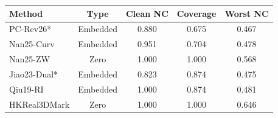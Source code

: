 \begin{tabular}{lcccc}\toprule
Method & Type & Clean NC & Coverage & Worst NC \\\midrule
PC-Rev26* & Embedded & 0.880 & 0.675 & 0.467 \\
Nan25-Curv & Embedded & 0.951 & 0.704 & 0.478 \\
Nan25-ZW & Zero & 1.000 & 1.000 & 0.568 \\
Jiao23-Dual* & Embedded & 0.823 & 0.874 & 0.475 \\
Qiu19-RI & Embedded & 1.000 & 0.874 & 0.481 \\
HKReal3DMark & Zero & 1.000 & 1.000 & 0.646 \\
\bottomrule\end{tabular}
